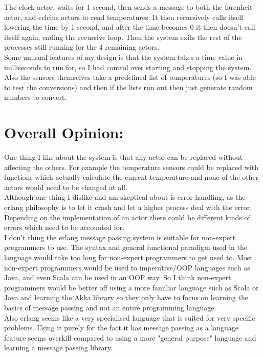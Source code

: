 \documentclass[fleqn]{report}
\begin{document}
The clock actor, waits for 1 second, then sends a message to both the farenheit actor,
and celcius actors to read temperatures. It then recursively calls itself lowering
the time by 1 second, and after the time becomes 0 it then doesn't call itself
again, ending the recursive loop. Then the system exits the rest of the processes
still running for the 4 remaining actors.\\

Some unusual features of my design is that the system takes a time value in milliseconds
to run for, so I had control over starting and stopping the system. Also the sensors
themselves take a predefined list of temperatures (so I was able to test the conversions)
and then if the lists run out then just generate random numbers to convert.\\

\section*{Overall Opinion:}

One thing I like about the system is that any actor can be replaced without
affecting the others. For example the temperature sensors could be replaced with
functions which actually calculate the current temperature and none of the other
actors would need to be changed at all.\\

Although one thing I dislike and am skeptical about is error handling, as the
erlang philosophy is to let it crash and let a higher process deal
with the error. Depending on the implementation of an actor there could be
different kinds of errors which need to be accounted for.\\

I don't thing the erlang message passing system is suitable for non-expert
programmers to use. The syntax and general functional paradigm 
used in the language would take too long for non-expert programmers to get 
used to. Most non-expert programmers would be used to imperative/OOP languages
such as Java, and even Scala can be used in an OOP way. So I think non-expert
programmers would be better off using a more familiar language such
as Scala or Java and learning the Akka library so they only have
to focus on learning the basics of message passing and not an entire
programming language. \\

Also erlang seems like a very specialised language that is
suited for very specific problems. Using it purely for
the fact it has message passing as a language feature 
seems overkill compared to using a more "general purpose" 
language and learning a message passing library.
\end{document}
